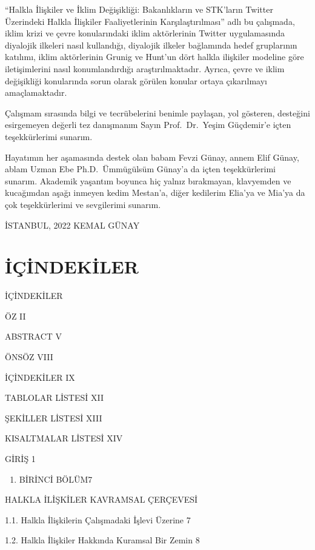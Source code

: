 \documentclass[
]{book}
\providecommand{\tightlist}{%
  \setlength{\itemsep}{0pt}\setlength{\parskip}{0pt}}
\begin{document}
``Halkla İlişkiler ve İklim Değişikliği: Bakanlıkların ve STK'ların Twitter Üzerindeki Halkla İlişkiler Faaliyetlerinin Karşılaştırılması'' adlı bu çalışmada, iklim krizi ve çevre konularındaki iklim aktörlerinin Twitter uygulamasında diyalojik ilkeleri nasıl kullandığı, diyalojik ilkeler bağlamında hedef gruplarının katılımı, iklim aktörlerinin Grunig ve Hunt'un dört halkla ilişkiler modeline göre iletişimlerini nasıl konumlandırdığı araştırılmaktadır. Ayrıca, çevre ve iklim değişikliği konularında sorun olarak görülen konular ortaya çıkarılmayı amaçlamaktadır.

Çalışmam sırasında bilgi ve tecrübelerini benimle paylaşan, yol gösteren, desteğini esirgemeyen değerli tez danışmanım Sayın Prof.~Dr.~Yeşim Güçdemir'e içten teşekkürlerimi sunarım.

Hayatımın her aşamasında destek olan babam Fevzi Günay, annem Elif Günay, ablam Uzman Ebe Ph.D.~Ümmügülsüm Günay'a da içten teşekkürlerimi sunarım. Akademik yaşantım boyunca hiç yalnız bırakmayan, klavyemden ve kucağımdan aşağı inmeyen kedim Mestan'a, diğer kedilerim Elia'ya ve Mia'ya da çok teşekkürlerimi ve sevgilerimi sunarım.

İSTANBUL, 2022
KEMAL GÜNAY

\hypertarget{iuxe7indekiler}{%
\chapter*{İÇİNDEKİLER}\label{iuxe7indekiler}}

İÇİNDEKİLER

ÖZ II

ABSTRACT V

ÖNSÖZ VIII

İÇİNDEKİLER IX

TABLOLAR LİSTESİ XII

ŞEKİLLER LİSTESİ XIII

KISALTMALAR LİSTESİ XIV

GİRİŞ 1

\begin{enumerate}
\def\labelenumi{\arabic{enumi}.}
\tightlist
\item
  BİRİNCİ BÖLÜM7
\end{enumerate}

HALKLA İLİŞKİLER KAVRAMSAL ÇERÇEVESİ

1.1. Halkla İlişkilerin Çalışmadaki İşlevi Üzerine 7

1.2. Halkla İlişkiler Hakkında Kuramsal Bir Zemin 8
\end{document}

